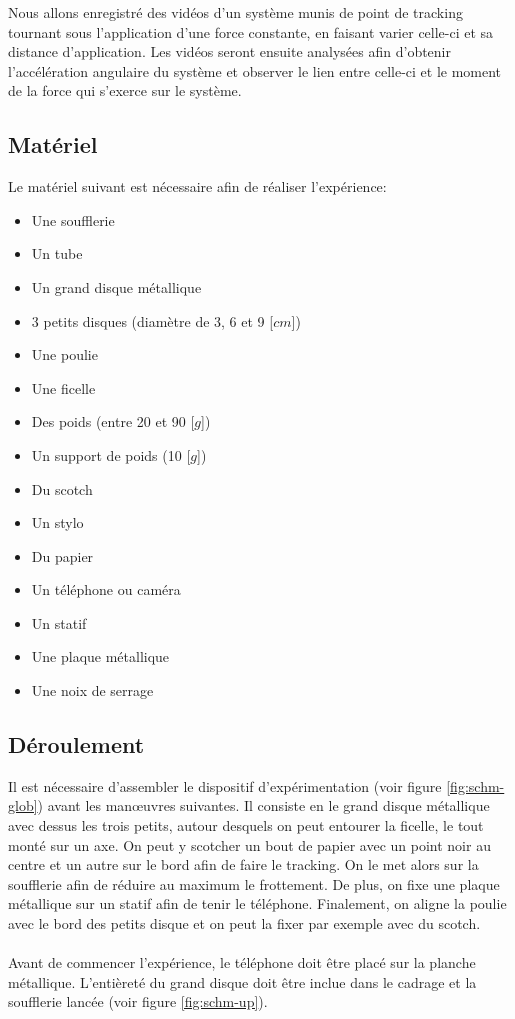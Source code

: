 Nous allons enregistré des vidéos d'un système munis de point de tracking tournant sous l'application d'une force constante, en faisant varier celle-ci et sa distance d'application. Les vidéos seront ensuite analysées afin d'obtenir l'accélération angulaire du système et observer le lien entre celle-ci et le moment de la force qui s'exerce sur le système.

\subsection{Matériel}
Le matériel suivant est nécessaire afin de réaliser l'expérience:
\begin{multicols}{2}
\begin{itemize}
    \item Une soufflerie
    \item Un tube
    \item Un grand disque métallique
    \item 3 petits disques (diamètre de 3, 6 et 9 [$cm$])
    \item Une poulie
    \item Une ficelle
    \item Des poids (entre 20 et 90 [$g$])
    \item Un support de poids (10 [$g$])
    \item Du scotch
    \item Un stylo
    \item Du papier
    \item Un téléphone ou caméra
    \item Un statif
    \item Une plaque métallique
    \item Une noix de serrage
\end{itemize}
\end{multicols}

\subsection{Déroulement}
Il est nécessaire d'assembler le dispositif d'expérimentation (voir figure \ref{fig:schm-glob}) avant les manœuvres suivantes. Il consiste en le grand disque métallique avec dessus les trois petits, autour desquels on peut entourer la ficelle, le tout monté sur un axe. On peut y scotcher un bout de papier avec un point noir au centre et un autre sur le bord afin de faire le tracking. On le met alors sur la soufflerie afin de réduire au maximum le frottement. De plus, on fixe une plaque métallique sur un statif afin de tenir le téléphone. Finalement, on aligne la poulie avec le bord des petits disque et on peut la fixer par exemple avec du scotch.\\ \\
Avant de commencer l'expérience, le téléphone doit être placé sur la planche métallique. L'entièreté du grand disque doit être inclue dans le cadrage et la soufflerie lancée (voir figure \ref{fig:schm-up}).

